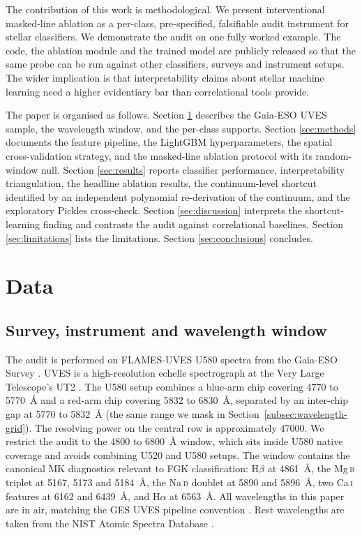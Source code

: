 \documentclass[11pt,a4paper]{article}
\newcommand{\Halpha}{H$\alpha$\xspace}
\newcommand{\Hbeta}{H$\beta$\xspace}
\newcommand{\Mgb}{Mg\,\textsc{b}\xspace}
\newcommand{\NaD}{Na\,\textsc{d}\xspace}
\newcommand{\CaI}{Ca\,\textsc{i}\xspace}
\begin{document}
The contribution of this work is methodological. We present interventional masked-line ablation as a per-class, pre-specified, falsifiable audit instrument for stellar classifiers. We demonstrate the audit on one fully worked example. The code, the ablation module and the trained model are publicly released so that the same probe can be run against other classifiers, surveys and instrument setups. The wider implication is that interpretability claims about stellar machine learning need a higher evidentiary bar than correlational tools provide.

The paper is organised as follows. Section \ref{sec:data} describes the Gaia-ESO UVES sample, the wavelength window, and the per-class supports. Section \ref{sec:methods} documents the feature pipeline, the LightGBM hyperparameters, the spatial cross-validation strategy, and the masked-line ablation protocol with its random-window null. Section \ref{sec:results} reports classifier performance, interpretability triangulation, the headline ablation results, the continuum-level shortcut identified by an independent polynomial re-derivation of the continuum, and the exploratory Pickles cross-check. Section \ref{sec:discussion} interprets the shortcut-learning finding and contrasts the audit against correlational baselines. Section \ref{sec:limitations} lists the limitations. Section \ref{sec:conclusions} concludes.

\section{Data}
\label{sec:data}

\subsection{Survey, instrument and wavelength window}

The audit is performed on FLAMES-UVES U580 spectra from the Gaia-ESO Survey \citep{2022A&A...666A.120G}. UVES is a high-resolution echelle spectrograph at the Very Large Telescope's UT2 \citep{2000SPIE.4008..534D}. The U580 setup combines a blue-arm chip covering 4770 to 5770~\AA{} and a red-arm chip covering 5832 to 6830~\AA{}, separated by an inter-chip gap at 5770 to 5832~\AA{} (the same range we mask in Section~\ref{subsec:wavelength-grid}). The resolving power on the central row is approximately 47000. We restrict the audit to the 4800 to 6800~\AA{} window, which sits inside U580 native coverage and avoids combining U520 and U580 setups. The window contains the canonical MK diagnostics relevant to FGK classification: \Hbeta at 4861~\AA{}, the \Mgb triplet at 5167, 5173 and 5184~\AA{}, the \NaD doublet at 5890 and 5896~\AA{}, two \CaI features at 6162 and 6439~\AA{}, and \Halpha at 6563~\AA{}. All wavelengths in this paper are in air, matching the GES UVES pipeline convention \citep{2014A&A...565A.113S}. Rest wavelengths are taken from the NIST Atomic Spectra Database \citep{NIST_ASD_2023}.
\end{document}
